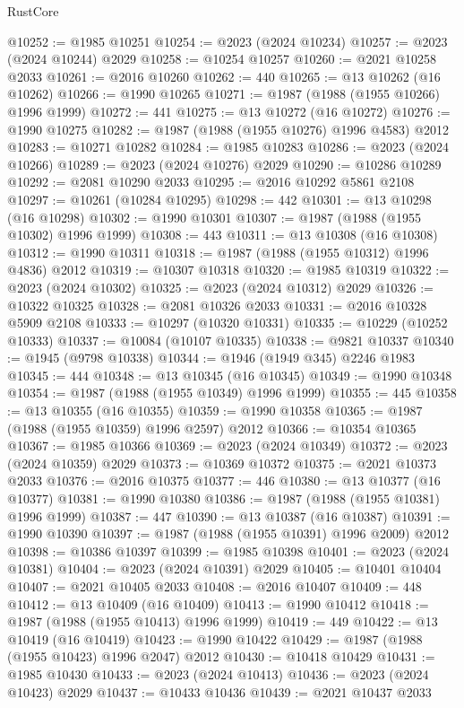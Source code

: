 \begin{lexlean}{RustCore}
\begin{coremodule}
@10252 := @1985 @10251
@10254 := @2023 (@2024 @10234)
@10257 := @2023 (@2024 @10244) @2029
@10258 := @10254 @10257
@10260 := @2021 @10258 @2033
@10261 := @2016 @10260
@10262 := 440
@10265 := @13 @10262 (@16 @10262)
@10266 := @1990 @10265
@10271 := @1987 (@1988 (@1955 @10266) @1996 @1999)
@10272 := 441
@10275 := @13 @10272 (@16 @10272)
@10276 := @1990 @10275
@10282 := @1987 (@1988 (@1955 @10276) @1996 @4583) @2012
@10283 := @10271 @10282
@10284 := @1985 @10283
@10286 := @2023 (@2024 @10266)
@10289 := @2023 (@2024 @10276) @2029
@10290 := @10286 @10289
@10292 := @2081 @10290 @2033
@10295 := @2016 @10292 @5861 @2108
@10297 := @10261 (@10284 @10295)
@10298 := 442
@10301 := @13 @10298 (@16 @10298)
@10302 := @1990 @10301
@10307 := @1987 (@1988 (@1955 @10302) @1996 @1999)
@10308 := 443
@10311 := @13 @10308 (@16 @10308)
@10312 := @1990 @10311
@10318 := @1987 (@1988 (@1955 @10312) @1996 @4836) @2012
@10319 := @10307 @10318
@10320 := @1985 @10319
@10322 := @2023 (@2024 @10302)
@10325 := @2023 (@2024 @10312) @2029
@10326 := @10322 @10325
@10328 := @2081 @10326 @2033
@10331 := @2016 @10328 @5909 @2108
@10333 := @10297 (@10320 @10331)
@10335 := @10229 (@10252 @10333)
@10337 := @10084 (@10107 @10335)
@10338 := @9821 @10337
@10340 := @1945 (@9798 @10338)
@10344 := @1946 (@1949 @345) @2246 @1983
@10345 := 444
@10348 := @13 @10345 (@16 @10345)
@10349 := @1990 @10348
@10354 := @1987 (@1988 (@1955 @10349) @1996 @1999)
@10355 := 445
@10358 := @13 @10355 (@16 @10355)
@10359 := @1990 @10358
@10365 := @1987 (@1988 (@1955 @10359) @1996 @2597) @2012
@10366 := @10354 @10365
@10367 := @1985 @10366
@10369 := @2023 (@2024 @10349)
@10372 := @2023 (@2024 @10359) @2029
@10373 := @10369 @10372
@10375 := @2021 @10373 @2033
@10376 := @2016 @10375
@10377 := 446
@10380 := @13 @10377 (@16 @10377)
@10381 := @1990 @10380
@10386 := @1987 (@1988 (@1955 @10381) @1996 @1999)
@10387 := 447
@10390 := @13 @10387 (@16 @10387)
@10391 := @1990 @10390
@10397 := @1987 (@1988 (@1955 @10391) @1996 @2009) @2012
@10398 := @10386 @10397
@10399 := @1985 @10398
@10401 := @2023 (@2024 @10381)
@10404 := @2023 (@2024 @10391) @2029
@10405 := @10401 @10404
@10407 := @2021 @10405 @2033
@10408 := @2016 @10407
@10409 := 448
@10412 := @13 @10409 (@16 @10409)
@10413 := @1990 @10412
@10418 := @1987 (@1988 (@1955 @10413) @1996 @1999)
@10419 := 449
@10422 := @13 @10419 (@16 @10419)
@10423 := @1990 @10422
@10429 := @1987 (@1988 (@1955 @10423) @1996 @2047) @2012
@10430 := @10418 @10429
@10431 := @1985 @10430
@10433 := @2023 (@2024 @10413)
@10436 := @2023 (@2024 @10423) @2029
@10437 := @10433 @10436
@10439 := @2021 @10437 @2033

\end{coremodule}
\end{lexlean}
